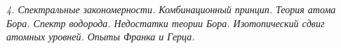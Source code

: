 \emph{4. Спектральные закономерности. Комбинационный принцип. Теория 
атома Бора. Спектр водорода. Недостатки теории Бора. Изотопический 
сдвиг атомных уровней. Опыты Франка и Герца.}

\newpage

